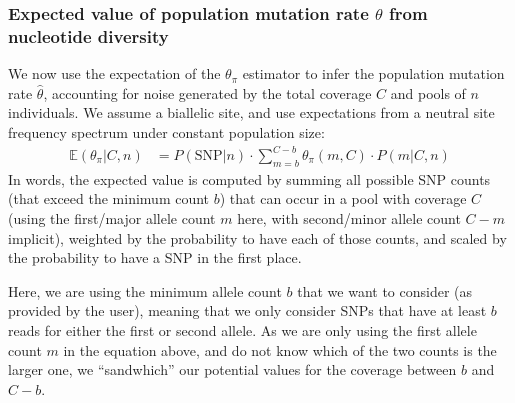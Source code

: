 \documentclass[a4paper,9pt,DIV=14]{scrartcl}
\newcounter{todo}
\newcommand\todo[1]{}
\begin{document}
%
%


\subsubsection*{Expected value of population mutation rate $\theta$ from nucleotide diversity}
\label{supp:sec:ThetaPi:sub:PoolSequencing:sub:ExpectedValue}

\todo{we probably need to explain better what we mean by expected  $\theta_\pi$. Jeff, would it be more appropriate to have something like $\theta_{\theta_\pi}$ to be clear? or $\hat{\theta_\pi}$ ? }

We now use the expectation of the $\theta_\pi$ estimator to infer the population mutation rate $\hat{\theta}$, accounting for noise generated by the total coverage $C$ and pools of $n$ individuals. We assume a biallelic site, and use expectations from a neutral site frequency spectrum under constant population size:
%
\begin{align}
\label{eq:ExpectationThetaPi}
\mathbb{E}(\theta_\pi|C,n) &= P(\mbox{SNP} | n) \cdot \sum_{m=b}^{C-b} \theta_\pi(m,C) \cdot P(m|C,n)
\end{align}
%
In words, the expected value is computed by summing all possible SNP counts (that exceed the minimum count $b$) 
that can occur in a pool with coverage $C$ 
(using the first/major allele count $m$ here, with second/minor allele count $C-m$ implicit),
weighted by the probability to have each of those counts, %
and scaled by the probability to have a SNP in the first place. 

Here, we are using the minimum allele count $b$ that we want to consider (as provided by the user),
meaning that we only consider SNPs that have at least $b$ reads for either the first or second allele. %
As we are only using the first allele count $m$ in the equation above, 
and do not know which of the two counts is the larger one, 
we ``sandwhich'' our potential values for the coverage between $b$ and $C-b$.
\end{document}
